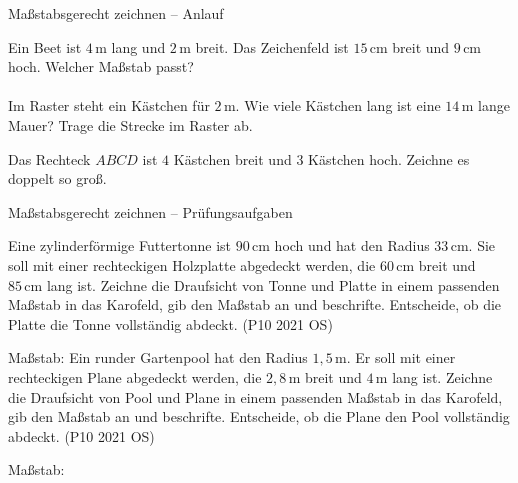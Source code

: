 \begin{aufgabe}{Maßstabsgerecht zeichnen – Anlauf}
\begin{teile}
\teil Ein Beet ist $4\,\text{m}$ lang und $2\,\text{m}$ breit. Das Zeichenfeld ist $15\,\text{cm}$ breit und $9\,\text{cm}$ hoch. Welcher Maßstab passt?  \\  \\ 
\teil Im Raster steht ein Kästchen für $2\,\text{m}$. Wie viele Kästchen lang ist eine $14\,\text{m}$ lange Mauer? Trage die Strecke im Raster ab.

\begin{ksys}[xmin=0,xmax=10,ymin=0,ymax=3]\end{ksys}
\leerfeld[Kästchen]
\teil Das Rechteck $ABCD$ ist $4$ Kästchen breit und $3$ Kästchen hoch. Zeichne es doppelt so groß.

\begin{ksys}[xmin=0,xmax=14,ymin=0,ymax=10]\end{ksys}
\end{teile}
\end{aufgabe}

\begin{aufgabe}{Maßstabsgerecht zeichnen – Prüfungsaufgaben}
\begin{teile}
\steil Eine zylinderförmige Futtertonne ist $90\,\text{cm}$ hoch und hat den Radius $33\,\text{cm}$. Sie soll mit einer rechteckigen Holzplatte abgedeckt werden, die $60\,\text{cm}$ breit und $85\,\text{cm}$ lang ist. Zeichne die Draufsicht von Tonne und Platte in einem passenden Maßstab in das Karofeld, gib den Maßstab an und beschrifte. Entscheide, ob die Platte die Tonne vollständig abdeckt. \hfill (P10 2021 OS) \\

\begin{ksys}[xmin=0,xmax=13,ymin=0,ymax=14]\end{ksys}
Maßstab: \leerfeld
\steil Ein runder Gartenpool hat den Radius $1{,}5\,\text{m}$. Er soll mit einer rechteckigen Plane abgedeckt werden, die $2{,}8\,\text{m}$ breit und $4\,\text{m}$ lang ist. Zeichne die Draufsicht von Pool und Plane in einem passenden Maßstab in das Karofeld, gib den Maßstab an und beschrifte. Entscheide, ob die Plane den Pool vollständig abdeckt. \hfill (P10 2021 OS) \\

\begin{ksys}[xmin=0,xmax=13,ymin=0,ymax=14]\end{ksys}
Maßstab: \leerfeld
\end{teile}
\end{aufgabe}
